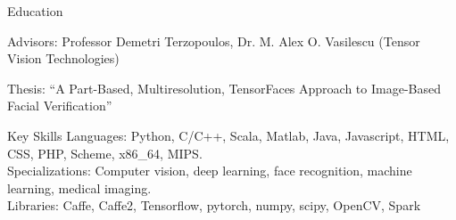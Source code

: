 \documentclass{resume}
\begin{document}
\maketitle
\thispagestyle{empty} %

\vspace{-0.5em}


\vspace{-0.5em}

\begin{component}{Education}

    \hspace{1em} Advisors: Professor Demetri Terzopoulos, Dr. M. Alex O. Vasilescu (Tensor Vision Technologies)

    \hspace{1em} Thesis: ``{A Part-Based, Multiresolution, TensorFaces Approach to Image-Based Facial Verification}''
    
\end{component}

\vspace{-0.25em}

\begin{component}{Key Skills}
		Languages: Python, C/C++, Scala, Matlab, Java, Javascript, HTML, CSS, PHP, Scheme, x86\_64, MIPS.\\
        Specializations: Computer vision, deep learning, face recognition, machine learning, medical imaging.\\
		Libraries: Caffe, Caffe2, Tensorflow, pytorch, numpy, scipy, OpenCV, Spark \\
\end{component}

\vspace{-1.5em}
\end{document}

